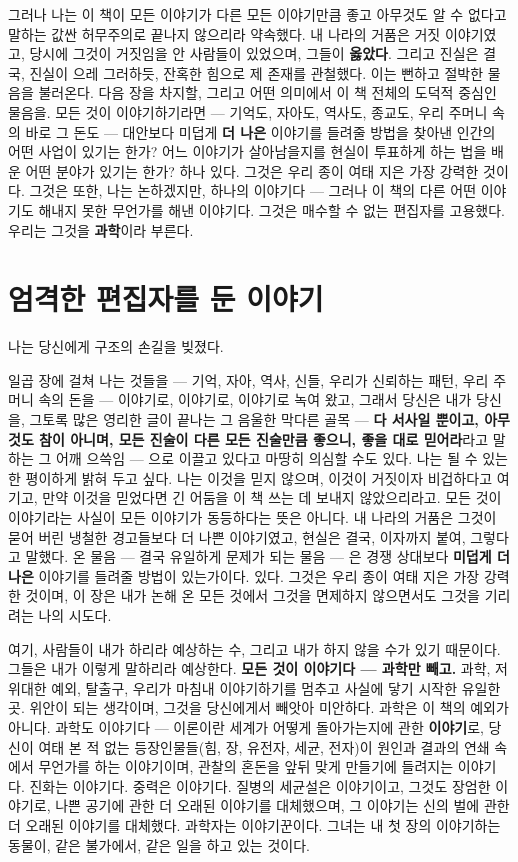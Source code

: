 그러나 나는 이 책이 모든 이야기가 다른 모든 이야기만큼 좋고 아무것도 알 수 없다고 말하는 값싼 허무주의로 끝나지 않으리라 약속했다. 내 나라의 거품은 거짓 이야기였고, 당시에 그것이 거짓임을 안 사람들이 있었으며, 그들이 \textbf{옳았다}. 그리고 진실은 결국, 진실이 으레 그러하듯, 잔혹한 힘으로 제 존재를 관철했다. 이는 뻔하고 절박한 물음을 불러온다. 다음 장을 차지할, 그리고 어떤 의미에서 이 책 전체의 도덕적 중심인 물음을. 모든 것이 이야기하기라면 — 기억도, 자아도, 역사도, 종교도, 우리 주머니 속의 바로 그 돈도 — 대안보다 미덥게 \textbf{더 나은} 이야기를 들려줄 방법을 찾아낸 인간의 어떤 사업이 있기는 한가? 어느 이야기가 살아남을지를 현실이 투표하게 하는 법을 배운 어떤 분야가 있기는 한가? 하나 있다. 그것은 우리 종이 여태 지은 가장 강력한 것이다. 그것은 또한, 나는 논하겠지만, 하나의 이야기다 — 그러나 이 책의 다른 어떤 이야기도 해내지 못한 무언가를 해낸 이야기다. 그것은 매수할 수 없는 편집자를 고용했다. 우리는 그것을 \textbf{과학}이라 부른다.

\chapter{엄격한 편집자를 둔 이야기}

나는 당신에게 구조의 손길을 빚졌다.

일곱 장에 걸쳐 나는 것들을 — 기억, 자아, 역사, 신들, 우리가 신뢰하는 패턴, 우리 주머니 속의 돈을 — 이야기로, 이야기로, 이야기로 녹여 왔고, 그래서 당신은 내가 당신을, 그토록 많은 영리한 글이 끝나는 그 음울한 막다른 골목 — \textbf{다 서사일 뿐이고, 아무것도 참이 아니며, 모든 진술이 다른 모든 진술만큼 좋으니, 좋을 대로 믿어라}라고 말하는 그 어깨 으쓱임 — 으로 이끌고 있다고 마땅히 의심할 수도 있다. 나는 될 수 있는 한 평이하게 밝혀 두고 싶다. 나는 이것을 믿지 않으며, 이것이 거짓이자 비겁하다고 여기고, 만약 이것을 믿었다면 긴 어둠을 이 책 쓰는 데 보내지 않았으리라고. 모든 것이 이야기라는 사실이 모든 이야기가 동등하다는 뜻은 아니다. 내 나라의 거품은 그것이 묻어 버린 냉철한 경고들보다 더 나쁜 이야기였고, 현실은 결국, 이자까지 붙여, 그렇다고 말했다. 온 물음 — 결국 유일하게 문제가 되는 물음 — 은 경쟁 상대보다 \textbf{미덥게 더 나은} 이야기를 들려줄 방법이 있는가이다. 있다. 그것은 우리 종이 여태 지은 가장 강력한 것이며, 이 장은 내가 논해 온 모든 것에서 그것을 면제하지 않으면서도 그것을 기리려는 나의 시도다.

여기, 사람들이 내가 하리라 예상하는 수, 그리고 내가 하지 않을 수가 있기 때문이다. 그들은 내가 이렇게 말하리라 예상한다. \textbf{모든 것이 이야기다 — 과학만 빼고.} 과학, 저 위대한 예외, 탈출구, 우리가 마침내 이야기하기를 멈추고 사실에 닿기 시작한 유일한 곳. 위안이 되는 생각이며, 그것을 당신에게서 빼앗아 미안하다. 과학은 이 책의 예외가 아니다. 과학도 이야기다 — 이론이란 세계가 어떻게 돌아가는지에 관한 \textbf{이야기}로, 당신이 여태 본 적 없는 등장인물들(힘, 장, 유전자, 세균, 전자)이 원인과 결과의 연쇄 속에서 무언가를 하는 이야기이며, 관찰의 혼돈을 앞뒤 맞게 만들기에 들려지는 이야기다. 진화는 이야기다. 중력은 이야기다. 질병의 세균설은 이야기이고, 그것도 장엄한 이야기로, 나쁜 공기에 관한 더 오래된 이야기를 대체했으며, 그 이야기는 신의 벌에 관한 더 오래된 이야기를 대체했다. 과학자는 이야기꾼이다. 그녀는 내 첫 장의 이야기하는 동물이, 같은 불가에서, 같은 일을 하고 있는 것이다.

